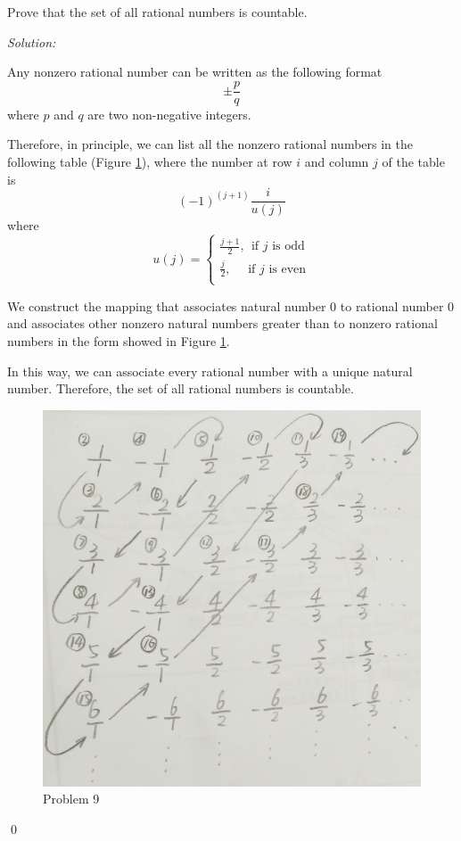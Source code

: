 \documentclass[12pt]{article}
\newenvironment{problem}[2][Problem]{\begin{trivlist}
\item[\hskip \labelsep {\bfseries #1}\hskip \labelsep {\bfseries #2.}]}{\end{trivlist}}
\newenvironment{sol}
    {\emph{Solution:}
    }
    {
    \qed
    }
\begin{document}
\begin{problem}{9}
Prove that the set of all rational numbers is countable.
\end{problem}
\begin{sol}
Any nonzero rational number can be written as the following format
\[
\pm\frac{p}{q}
\]
where $p$ and $q$ are two non-negative integers.

Therefore, in principle, we can list all the nonzero rational numbers in the following table (Figure \ref{Problem9}), where the number at row $i$ and column $j$ of the table is
\[
(-1)^{(j+1)}\frac{i}{u(j)}
\]
where
\[
u(j)=\left\{\begin{array}{ll}
\frac{j+1}{2}, ~~\text{if }j\text{ is odd}\\
\frac{j}{2}, ~~~~~~\text{if }j\text{ is even}\\
\end{array}\right.
\]

We construct the mapping that associates natural number $0$ to rational number $0$ and associates other nonzero natural numbers greater than to nonzero rational numbers in the form showed in Figure \ref{Problem9}.

In this way, we can associate every rational number with a unique natural number. Therefore, the set of all rational numbers is countable.
\begin{figure}[h]
\centering
\includegraphics[scale=.15]{Homework_1Problem_9.jpg}
\caption{Problem 9} \label{Problem9}
\end{figure}
\end{sol}
\end{document}
